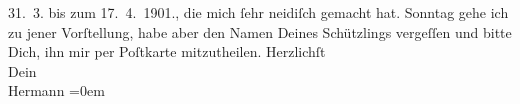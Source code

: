 \begin{ledgroupsized}[t]{13cm}
{{{                     31. 3. bis zum 17. 4. 1901.}}}\label{K_L01115_1h},
               die mich ſehr neidiſch gemacht hat.\pend
           \pstart
           Sonntag gehe ich zu jener Vorſtellung, habe aber den Namen Deines Schützlings vergeſſen und bitte Dich, ihn
               mir per Poſtkarte mitzutheilen.\pend
           \pstart
           Herzlichſt{\\[\baselineskip]}Dein{\\[\baselineskip]}\spacefill\mbox{Hermann}\pend
           \leftskip=0em{}\endnumbering{}\end{ledgroupsized}  \newcommand{\dateiname}{L01115}\newcommand{\titel}{Hermann Bahr an Arthur Schnitzler, 25. 4. [1901]}\newcommand{\editorInnen}{ Kurt Ifkovits,  Martin Anton Müller}
      